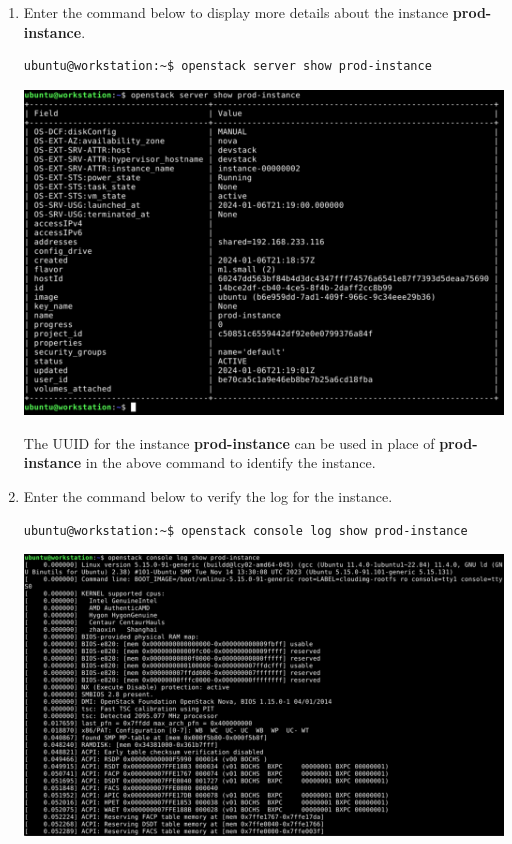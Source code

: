 \documentclass[letterpaper, 12pt]{article}
\begin{document}
\begin{enumerate}
    \item Enter the command below to display more details about the instance \textbf{prod-instance}.
\begin{lstlisting}
ubuntu@workstation:~$ openstack server show prod-instance
\end{lstlisting}

    \begin{center}
        \includegraphics[width=\linewidth]{images/part2/step13.png}
    \end{center}

    \begin{tipbox}{}
        The UUID for the instance \textbf{prod-instance} can be used in place of \textbf{prod-instance} in the above
        command to identify the instance.
    \end{tipbox}

    \item Enter the command below to verify the log for the instance.
\begin{lstlisting}
ubuntu@workstation:~$ openstack console log show prod-instance
\end{lstlisting}

    \begin{center}
        \includegraphics[width=\linewidth]{images/part2/step14.png}
    \end{center}


\end{enumerate}
\end{document}
